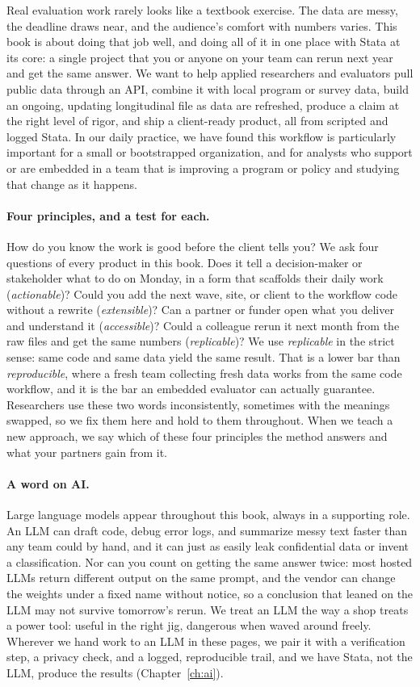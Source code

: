 Real evaluation work rarely looks like a textbook exercise. The data are messy, the deadline draws near, and the audience's comfort with numbers varies. This book is about doing that job well, and doing all of it in one place with Stata at its core: a single project that you or anyone on your team can rerun next year and get the same answer. We want to help applied researchers and evaluators pull public data through an API, combine it with local program or survey data, build an ongoing, updating longitudinal file as data are refreshed, produce a claim at the right level of rigor, and ship a client-ready product, all from scripted and logged Stata. In our daily practice, we have found this workflow is particularly important for a small or bootstrapped organization, and for analysts who support or are embedded in a team that is improving a program or policy and studying that change as it happens.


\paragraph{Four principles, and a test for each.} How do you know the work is good before the client tells you? We ask four questions of every product in this book. Does it tell a decision-maker or stakeholder what to do on Monday, in a form that scaffolds their daily work (\emph{actionable})? Could you add the next wave, site, or client to the workflow code without a rewrite (\emph{extensible})? Can a partner or funder open what you deliver and understand it (\emph{accessible})? Could a colleague rerun it next month from the raw files and get the same numbers (\emph{replicable})? We use \emph{replicable} in the strict sense: same code and same data yield the same result. That is a lower bar than \emph{reproducible}, where a fresh team collecting fresh data works from the same code workflow, and it is the bar an embedded evaluator can actually guarantee. Researchers use these two words inconsistently, sometimes with the meanings swapped, so we fix them here and hold to them throughout. When we teach a new approach, we say which of these four principles the method answers and what your partners gain from it.

\paragraph{A word on AI.} Large language models appear throughout this book, always in a supporting role. An LLM can draft code, debug error logs, and summarize messy text faster than any team could by hand, and it can just as easily leak confidential data or invent a classification. Nor can you count on getting the same answer twice: most hosted LLMs return different output on the same prompt, and the vendor can change the weights under a fixed name without notice, so a conclusion that leaned on the LLM may not survive tomorrow's rerun. We treat an LLM the way a shop treats a power tool: useful in the right jig, dangerous when waved around freely. Wherever we hand work to an LLM in these pages, we pair it with a verification step, a privacy check, and a logged, reproducible trail, and we have Stata, not the LLM, produce the results (Chapter~\ref{ch:ai}).

